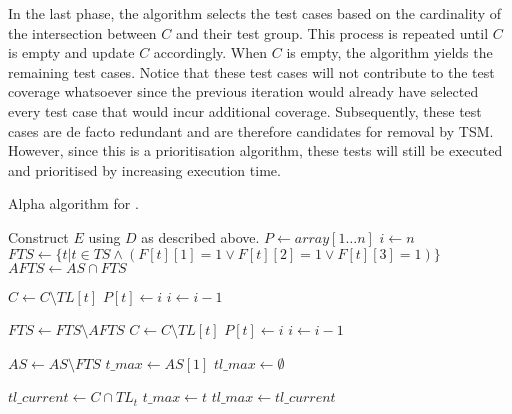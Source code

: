 \noindent In the last phase, the algorithm selects the test cases based on the cardinality of the intersection between $C$ and their test group. This process is repeated until $C$ is empty and update $C$ accordingly. When $C$ is empty, the algorithm yields the remaining test cases. Notice that these test cases will not contribute to the test coverage whatsoever since the previous iteration would already have selected every test case that would incur additional coverage. Subsequently, these test cases are de facto redundant and are therefore candidates for removal by TSM. However, since this is a prioritisation algorithm, these tests will still be executed and prioritised by increasing execution time.

\begin{algorithm}[htbp!]
\caption{Alpha algorithm for \tcp{}.}
\label{alg:alpha}
\begin{algorithmic}[1]
	
	
		\State Construct $E$ using $D$ as described above.
		\State $P \gets array[1 \dots n]$ 
		\State $i \gets n$
		\State $FTS \gets \{t \vert t \in TS \wedge (F[t][1] = 1 \vee F[t][2] = 1 \vee F[t][3] = 1)\}$
		\State $AFTS \gets AS \cap FTS$
		
		 
			\State $C \gets C \setminus TL[t]$
			\State $P[t] \gets i$
			\State $i \gets i - 1$
		\EndFor
		
		\State $FTS \gets FTS \setminus AFTS$
		 
			\State $C \gets C \setminus TL[t]$
			\State $P[t] \gets i$
			\State $i \gets i - 1$
		\EndFor
		
		\State $AS \gets AS \setminus FTS$
			\State $t\_max \gets AS[1]$ 
			\State $tl\_max \gets \emptyset$
			
				\State $tl\_current \gets C \cap TL_{t}$
					\State $t\_max \gets t$
					\State $tl\_max \gets tl\_current$
				\EndIf
			\EndFor
			

\end{algorithmic}
\end{algorithm}
